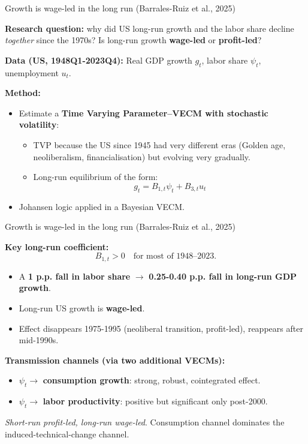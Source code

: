 \documentclass{beamer}
\begin{document}
\begin{frame}{Growth is wage-led in the long run (Barrales-Ruiz et al., 2025)}
\small

\textbf{Research question:}  why did US long-run growth and the labor share decline \emph{together} since the 1970s? Is long-run growth \textbf{wage-led} or \textbf{profit-led}?

\medskip

\textbf{Data (US, 1948Q1-2023Q4):}  
Real GDP growth $g_t$, labor share $\psi_t$, unemployment $u_t$.

\medskip

\textbf{Method:}  
\begin{itemize}
  \item Estimate a \textbf{Time Varying Parameter–VECM with stochastic volatility}:
        \begin{itemize}
          \item TVP because the US since 1945 had very different eras (Golden age, neoliberalism, financialisation) but evolving very gradually.
          \item Long-run equilibrium of the form:
          \[
            g_t = B_{1,t}\psi_t + B_{3,t}u_t
          \]
        \end{itemize}
  \item Johansen logic applied in a Bayesian VECM.
\end{itemize}

\end{frame}



\begin{frame}{Growth is wage-led in the long run (Barrales-Ruiz et al., 2025)}
\small

\textbf{Key long-run coefficient:}
\[
B_{1,t} > 0 \quad \text{for most of 1948–2023}.
\]
\begin{itemize}
  \item A \textbf{1 p.p. fall in labor share} $\to$ \textbf{0.25-0.40 p.p. fall in long-run GDP growth}.
  \item Long-run US growth is \textbf{wage-led}.
  \item Effect disappears 1975-1995 (neoliberal transition, profit-led), reappears after mid-1990s.
\end{itemize}

\medskip

\textbf{Transmission channels (via two additional VECMs):}
\begin{itemize}
  \item $\psi_t \to$ \textbf{consumption growth}: strong, robust, cointegrated effect.
  \item $\psi_t \to$ \textbf{labor productivity}: positive but significant only post-2000.
\end{itemize}

\emph{Short-run profit-led, long-run wage-led}.  
Consumption channel dominates the induced-technical-change channel.
\end{frame}
\end{document}
